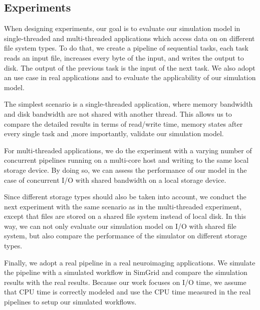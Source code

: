 \documentclass[conference]{IEEEtran}
\begin{document}
		\subsection{Experiments}
		
			When designing experiments, our goal is to evaluate our simulation model 
			in single-threaded and multi-threaded applications which access data on 
			on different file system types. 
			To do that, we create a pipeline of sequential tasks, each task 
			reads an input file, increases every byte of the input, and writes the 
			output to disk. The output of the previous task is the input of 
			the next task. We also adopt an use case in real applications and 
			to evaluate the applicability of our simulation model.
			
			The simplest scenario is a single-threaded application, where memory 
			bandwidth and disk bandwidth are not shared with another thread. 
			This allows us to compare the detailed results in terms of read/write time, 
			memory states after every single task and ,more importantly, validate our 
			simulation model. 
			
			For multi-threaded applications, we do the experiment with a varying 
			number of concurrent pipelines running on a multi-core host 
			and writing to the same local storage device. 
		    By doing so, we can assess the performance of our model in the case  
		    of concurrent I/O with shared bandwidth on a local storage device.
		    
		    Since different storage types should also be taken into account, 
		    we conduct the next experiment with the same scenario as 
		    in the multi-threaded experiment, except that files are stored on a 
		    shared file system instead of local disk. 
		    In this way, we can not only evaluate our simulation model on I/O 
		    with shared file system, but also compare the 
		    performance of the simulator on different storage types. 
		    
		    Finally, we adopt a real pipeline in a real neuroimaging applications. 
		    We simulate the pipeline with a simulated workflow in SimGrid 
			and compare the simulation results with the real results. 
			Because our work focuses on I/O time, we assume that CPU time is 
			correctly modeled and use the CPU time measured in the real pipelines 
			to setup our simulated workflows. 
			
\end{document}
